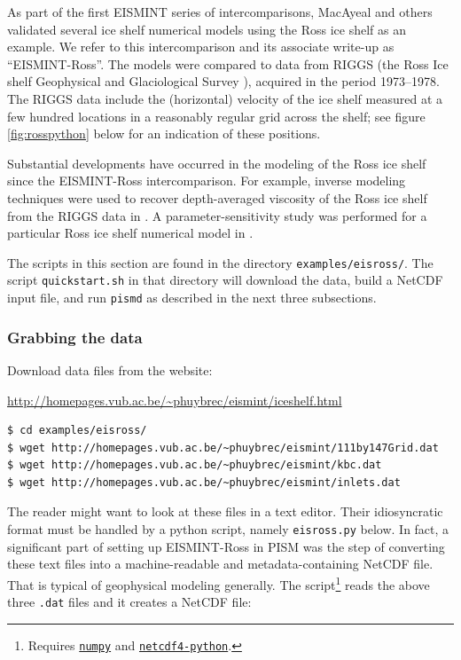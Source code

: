 \documentclass[11pt,final]{amsart}
\begin{document}
As part of the first EISMINT series of intercomparisons, MacAyeal and others \cite{MacAyealetal} validated several ice shelf numerical models using the Ross ice shelf as an example.  We refer to this intercomparison and its associate write-up \cite{MacAyealetal} as ``EISMINT-Ross''.  The models were compared to data from RIGGS (the Ross Ice shelf Geophysical and Glaciological Survey \cite{RIGGS2,RIGGS1}), acquired in the period 1973--1978.   The RIGGS data include the (horizontal) velocity of the ice shelf measured at a few hundred locations in a reasonably regular grid across the shelf; see figure \ref{fig:rosspython} below for an indication of these positions.

Substantial developments have occurred in the modeling of the Ross ice shelf since the EISMINT-Ross intercomparison.  For example, inverse modeling techniques were used to recover depth-averaged viscosity of the Ross ice shelf from the RIGGS data in \cite{RommelaereMacAyeal}. A parameter-sensitivity study was performed for a particular Ross ice shelf numerical model in \cite{HumbertGreveHutter}.

The scripts in this section are found in the directory \verb|examples/eisross/|.  The script \verb|quickstart.sh| in that directory will download the data, build a NetCDF input file, and run \verb|pismd| as described in the next three subsections.

\subsubsection*{Grabbing the data}  Download data files from the website:

\centerline{\url{http://homepages.vub.ac.be/~phuybrec/eismint/iceshelf.html}}
\small

\begin{verbatim}
$ cd examples/eisross/
$ wget http://homepages.vub.ac.be/~phuybrec/eismint/111by147Grid.dat
$ wget http://homepages.vub.ac.be/~phuybrec/eismint/kbc.dat
$ wget http://homepages.vub.ac.be/~phuybrec/eismint/inlets.dat
\end{verbatim}
\normalsize The reader might want to look at these files in a text editor.  Their idiosyncratic format must be handled by a python script, namely \verb|eisross.py| below.  In fact, a significant part of setting up EISMINT-Ross in PISM was the step of converting these text files into a machine-readable and metadata-containing NetCDF file.  That is typical of geophysical modeling generally.  The script\footnote{Requires \href{http://numpy.scipy.org/}{\texttt{numpy}} and \href{http://code.google.com/p/netcdf4-python/}{\texttt{netcdf4-python}}.} reads the above three \verb|.dat| files and it creates a NetCDF file:
\end{document}
